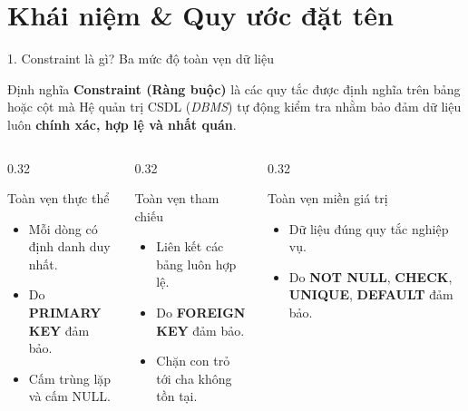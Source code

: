\documentclass[aspectratio=169,11pt]{beamer}
\newcommand{\kw}[1]{\textcolor{dbblue}{\textbf{#1}}}
\newcommand{\smallgap}{\vspace{0.2em}}
\begin{document}
\section{Khái niệm \& Quy ước đặt tên}
\begin{frame}{1. Constraint là gì? Ba mức độ toàn vẹn dữ liệu}
\begin{block}{Định nghĩa}
  \textbf{Constraint (Ràng buộc)} là các quy tắc được định nghĩa trên bảng hoặc cột mà Hệ quản trị CSDL (\textit{DBMS}) tự động kiểm tra nhằm bảo đảm dữ liệu luôn \kw{chính xác, hợp lệ và nhất quán}.
\end{block}

\smallgap
\begin{columns}[t]
  \begin{column}{0.32\textwidth}
    \begin{block}{Toàn vẹn thực thể}
      \begin{itemize}\setlength{\itemsep}{1.5pt}
        \item Mỗi dòng có định danh duy nhất.
        \item Do \kw{PRIMARY KEY} đảm bảo.
        \item Cấm trùng lặp và cấm NULL.
      \end{itemize}
    \end{block}
  \end{column}
  \begin{column}{0.32\textwidth}
    \begin{block}{Toàn vẹn tham chiếu}
      \begin{itemize}\setlength{\itemsep}{1.5pt}
        \item Liên kết các bảng luôn hợp lệ.
        \item Do \kw{FOREIGN KEY} đảm bảo.
        \item Chặn con trỏ tới cha không tồn tại.
      \end{itemize}
    \end{block}
  \end{column}
  \begin{column}{0.32\textwidth}
    \begin{block}{Toàn vẹn miền giá trị}
      \begin{itemize}\setlength{\itemsep}{1.5pt}
        \item Dữ liệu đúng quy tắc nghiệp vụ.
        \item Do \kw{NOT NULL}, \kw{CHECK}, \kw{UNIQUE}, \kw{DEFAULT} đảm bảo.
      \end{itemize}
    \end{block}
  \end{column}
\end{columns}
\end{frame}
\end{document}
